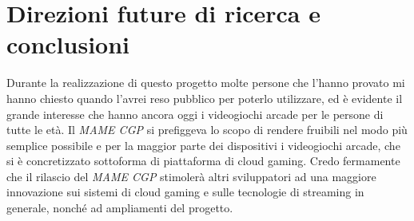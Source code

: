 %
%

\chapter*{Direzioni future di ricerca e conclusioni}


Durante la realizzazione di questo progetto molte persone che l'hanno provato mi hanno chiesto quando l'avrei reso pubblico per poterlo utilizzare, ed è evidente il grande interesse che hanno ancora oggi i videogiochi arcade per le persone di tutte le età. Il \textit{MAME CGP} si prefiggeva lo scopo di rendere fruibili nel modo più semplice possibile e per la maggior parte dei dispositivi i videogiochi arcade, che si è concretizzato sottoforma di piattaforma di cloud gaming. Credo fermamente che il rilascio del \textit{MAME CGP} stimolerà altri sviluppatori ad una maggiore innovazione sui sistemi di cloud gaming e sulle tecnologie di streaming in generale, nonché ad ampliamenti del progetto.

